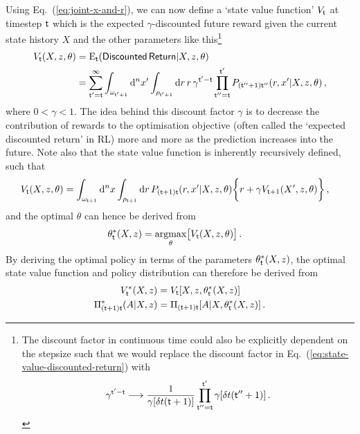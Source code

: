 Using Eq.~(\ref{eq:joint-x-and-r}), we can now define a `state value function' $V_{{\sf t}}$ at timestep ${\sf t}$ which is the expected $\gamma$-discounted future reward given the current state history $X$ and the other parameters like this\footnote{The discount factor in continuous time could also be explicitly dependent on the stepsize such that we would replace the discount factor in Eq.~(\ref{eq:state-value-discounted-return}) with
$$
\gamma^{{\sf t}'-{\sf t}} \longrightarrow \frac{1}{\gamma [\delta t({\sf t}+1)]}\prod_{{\sf t}''={\sf t}}^{{\sf t}'} \gamma [\delta t({\sf t}''+1)] \,.
$$}
\begin{align}
V_{{\sf t}}(X,z,\theta) &= {\rm E}_{{\sf t}}({\sf Discounted \,Return}\vert X, z, \theta ) \nonumber \\
&= \sum_{{\sf t}'={\sf t}}^{\infty} \int_{\omega_{{\sf t}'+1}}{\rm d}^nx'\int_{\rho_{{\sf t}'+1}} {\rm d}r \,r\, \gamma^{{\sf t}'-{\sf t}}\prod_{{\sf t}''={\sf t}}^{{\sf t}'}P_{({\sf t}''+1){\sf t}''}(r,x'\vert X, z,\theta) \label{eq:state-value-discounted-return}\,,
\end{align}
where $0 < \gamma < 1$. The idea behind this discount factor $\gamma$ is to decrease the contribution of rewards to the optimisation objective (often called the `expected discounted return' in RL) more and more as the prediction increases into the future. Note also that the state value function is inherently recursively defined, such that
\begin{align}
V_{{\sf t}}(X,z,\theta) &= \int_{\omega_{{\sf t}+1}}{\rm d}^nx\int_{\rho_{{\sf t}+1}} {\rm d}r \, P_{({\sf t}+1){\sf t}}(r,x'\vert X, z,\theta)\bigg\{ r+\gamma V_{{\sf t}+1}(X',z,\theta)\bigg\} \,,
\end{align}
and the optimal $\theta$ can hence be derived from
\begin{align}
\theta^*_{{\sf t}}(X,z) &= \underset{\theta}{{\rm argmax}} \big[ V_{{\sf t}}(X,z,\theta)\big] \,.
\end{align}
By deriving the optimal policy in terms of the parameters $\theta^*_{{\sf t}}(X,z)$, the optimal state value function and policy distribution can therefore be derived from
\begin{align}
V^*_{{\sf t}}(X,z) &= V_{{\sf t}}[X,z,\theta^*_{{\sf t}}(X,z)] \\
\Pi^*_{({\sf t}+1){\sf t}}(A\vert X,z) &= \Pi_{({\sf t}+1){\sf t}}[A\vert X,\theta^*_{{\sf t}}(X,z)] \,.
\end{align}


